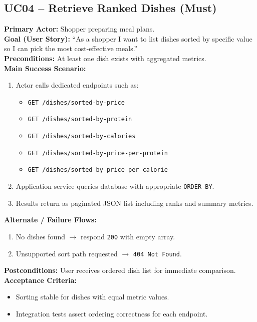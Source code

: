 \documentclass[11pt]{article}
\begin{document}
\subsection*{UC04 -- Retrieve Ranked Dishes (Must)}
\textbf{Primary Actor:} Shopper preparing meal plans.\\
\textbf{Goal (User Story):} ``As a shopper I want to list dishes sorted by specific value so I can pick the most cost-effective meals.''\\
\textbf{Preconditions:} At least one dish exists with aggregated metrics.\\
\textbf{Main Success Scenario:}
\begin{enumerate}[label=\arabic*.]
  \item Actor calls dedicated endpoints such as:
  \begin{itemize}[noitemsep]
    \item \texttt{GET /dishes/sorted-by-price}
    \item \texttt{GET /dishes/sorted-by-protein}
    \item \texttt{GET /dishes/sorted-by-calories}
    \item \texttt{GET /dishes/sorted-by-price-per-protein}
    \item \texttt{GET /dishes/sorted-by-price-per-calorie}
  \end{itemize}
  \item Application service queries database with appropriate \texttt{ORDER BY}.
  \item Results return as paginated JSON list including ranks and summary metrics.
\end{enumerate}
\textbf{Alternate / Failure Flows:}
\begin{enumerate}[label=\arabic*F.]
  \item No dishes found $\rightarrow$ respond \texttt{200} with empty array.
  \item Unsupported sort path requested $\rightarrow$ \texttt{404 Not Found}.
\end{enumerate}
\textbf{Postconditions:} User receives ordered dish list for immediate comparison.\\
\textbf{Acceptance Criteria:}
\begin{itemize}[noitemsep]
  \item Sorting stable for dishes with equal metric values.
  \item Integration tests assert ordering correctness for each endpoint.
\end{itemize}
\end{document}
